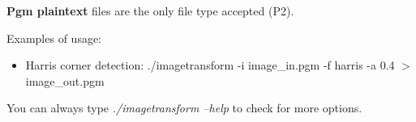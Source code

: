 \documentclass{article}
\begin{document}
	{\bf Pgm plaintext} files are the only file type accepted (P2). 

	Examples of usage:

	\begin{itemize}
		\item Harris corner detection:
		\subitem ./imagetransform -i image\_in.pgm -f harris -a 0.4 $>$ image\_out.pgm
	\end{itemize}

	You can always type {\it ./imagetransform --help} to check for more options. 
\end{document}
